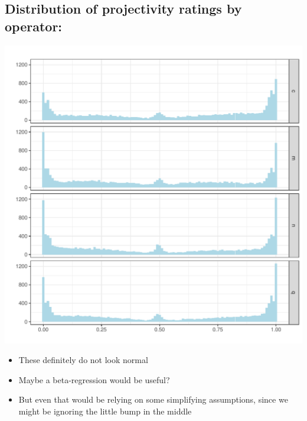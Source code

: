 \documentclass[10pt]{article}\usepackage[]{graphicx}\usepackage[dvipsnames]{xcolor}
\newenvironment{knitrout}{}{} %
\begin{document}
\subsection{Distribution of projectivity ratings by operator:}
\begin{knitrout}
\color{fgcolor}

{\centering \includegraphics[width=\linewidth]{figures/figuresproject-by-op-distr-1} 

}


\end{knitrout}

\begin{itemize}
  \item These definitely do not look normal
  \item Maybe a beta-regression would be useful?
  \item But even that would be relying on some simplifying assumptions, since we might be ignoring the little bump in the middle 
\end{itemize}

\newpage
\end{document}
